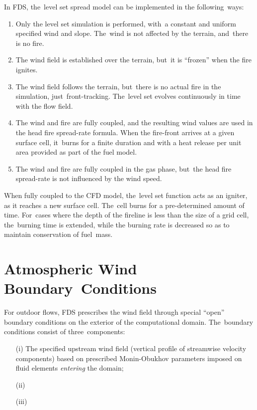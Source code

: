 \documentclass[atmosphere,article,accept,moreauthors,pdftex]{Definitions/mdpi}
\begin{document}
\begin{paracol}{2}
In FDS, the~level set spread model can be implemented in the following~ways:
\begin{enumerate}
\item Only the level set simulation is performed, with~a constant and uniform specified wind and slope. The~wind is not affected by the terrain, and~there is no fire.
\item The wind field is established over the terrain, but~it is ``frozen'' when the fire ignites.
\item The wind field follows the terrain, but~there is no actual fire in the simulation, \mbox{just front-tracking}.  The~level set evolves continuously in time with the flow field.
\item The wind and fire are fully coupled, and the resulting wind values are used in the head fire spread-rate formula. When the fire-front arrives at a given surface cell, \mbox{it burns} for a finite duration and with a heat release per unit area provided as part of the fuel model.
\item The wind and fire are fully coupled in the gas phase, but~the head fire spread-rate is not influenced by the wind speed. 
\end{enumerate}

When fully coupled to the CFD model, the~level set function acts as an igniter, as it reaches a new surface cell. The~cell burns for a pre-determined amount of time. For~cases where the depth of the fireline is less than the size of a grid cell, the~burning time is extended, while the burning rate is decreased so as to maintain conservation of fuel~mass.



\section{Atmospheric Wind Boundary~Conditions}
\label{sec:wind}

For outdoor flows, FDS prescribes the wind field through special ``open'' boundary conditions on the exterior of the computational domain.  The~boundary conditions consist of three~components:
\begin{enumerate}
\item[(i)] The specified upstream wind field (vertical profile of streamwise velocity components) based on prescribed Monin-Obukhov parameters imposed on fluid elements \emph{entering} the domain;
\item[(ii)]  
\item[(iii)] 
\end{enumerate}


\end{paracol}
\end{document}
